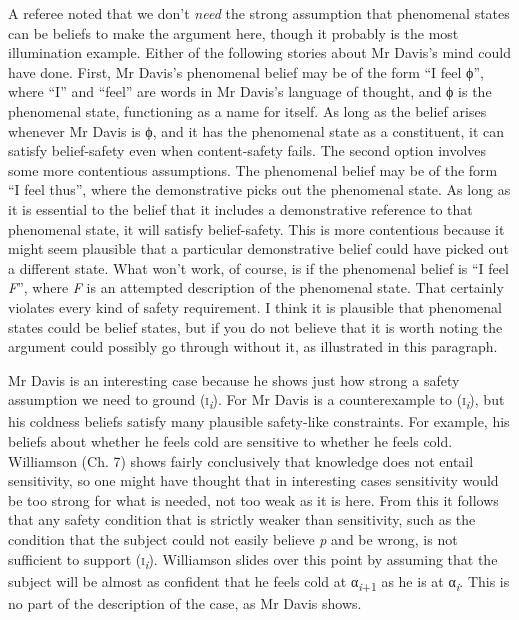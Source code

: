 \documentclass[
  10pt,
  letterpaper,
  DIV=11,
  numbers=noendperiod,
  twoside]{scrartcl}
\begin{document}
A referee noted that we don't \emph{need} the strong assumption that
phenomenal states can be beliefs to make the argument here, though it
probably is the most illumination example. Either of the following
stories about Mr Davis's mind could have done. First, Mr Davis's
phenomenal belief may be of the form ``I feel ϕ'', where ``I'' and
``feel'' are words in Mr Davis's language of thought, and ϕ is the
phenomenal state, functioning as a name for itself. As long as the
belief arises whenever Mr Davis is ϕ, and it has the phenomenal state as
a constituent, it can satisfy belief-safety even when content-safety
fails. The second option involves some more contentious assumptions. The
phenomenal belief may be of the form ``I feel thus'', where the
demonstrative picks out the phenomenal state. As long as it is essential
to the belief that it includes a demonstrative reference to that
phenomenal state, it will satisfy belief-safety. This is more
contentious because it might seem plausible that a particular
demonstrative belief could have picked out a different state. What won't
work, of course, is if the phenomenal belief is ``I feel \emph{F}'',
where \emph{F} is an attempted description of the phenomenal state. That
certainly violates every kind of safety requirement. I think it is
plausible that phenomenal states could be belief states, but if you do
not believe that it is worth noting the argument could possibly go
through without it, as illustrated in this paragraph.

Mr Davis is an interesting case because he shows just how strong a
safety assumption we need to ground
(\textsc{i}\textsubscript{\emph{i}}). For Mr Davis is a counterexample
to (\textsc{i}\textsubscript{\emph{i}}), but his coldness beliefs
satisfy many plausible safety-like constraints. For example, his beliefs
about whether he feels cold are sensitive to whether he feels cold.
Williamson (Ch. 7) shows fairly conclusively that knowledge does not
entail sensitivity, so one might have thought that in interesting cases
sensitivity would be too strong for what is needed, not too weak as it
is here. From this it follows that any safety condition that is strictly
weaker than sensitivity, such as the condition that the subject could
not easily believe \emph{p} and be wrong, is not sufficient to support
(\textsc{i}\textsubscript{\emph{i}}). Williamson slides over this point
by assuming that the subject will be almost as confident that he feels
cold at α\textsubscript{\emph{i}+1} as he is at
α\textsubscript{\emph{i}}. This is no part of the description of the
case, as Mr Davis shows.
\end{document}
